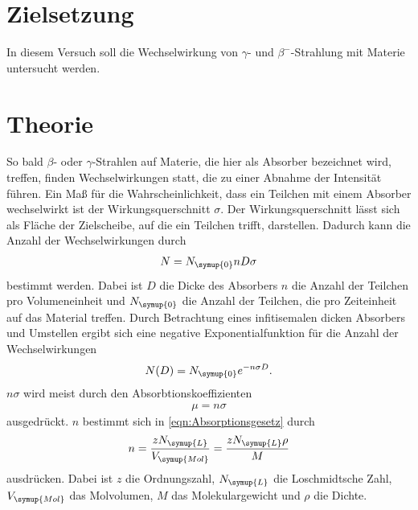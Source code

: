 \section{Zielsetzung}
\label{sec:Zielsetzung}
In diesem Versuch soll die Wechselwirkung von $\gamma$- und $\beta^{-}$-Strahlung mit Materie untersucht werden.

\section{Theorie}
\label{sec:Theorie}
So bald $\beta$- oder $\gamma$-Strahlen auf Materie, die hier als Absorber bezeichnet wird, treffen, finden
Wechselwirkungen statt, die zu einer Abnahme der Intensität führen. Ein Maß für die Wahrscheinlichkeit, dass
ein Teilchen mit einem Absorber wechselwirkt ist der Wirkungsquerschnitt $\sigma$. Der Wirkungsquerschnitt lässt
sich als Fläche der Zielscheibe, auf die ein Teilchen trifft, darstellen. Dadurch kann die Anzahl der
Wechselwirkungen durch
\begin{align*}
    N = N_{\symup{0}} n D \sigma
\end{align*}
bestimmt werden. Dabei ist $D$ die Dicke des Absorbers $n$ die Anzahl der Teilchen pro Volumeneinheit und
$N_{\symup{0}}$ die Anzahl der Teilchen, die pro Zeiteinheit auf das Material treffen. Durch Betrachtung eines
infitisemalen dicken Absorbers und Umstellen ergibt sich eine negative Exponentialfunktion für die Anzahl der
Wechselwirkungen
\begin{align}
    \label{eqn:Absorptionsgesetz}
    N(D) = N_{\symup{0}} e^{-n \sigma D}.
\end{align}
$n \sigma$ wird meist durch den Absorbtionskoeffizienten
\begin{align}
    \label{eqn:Absorbtionskoeffizient}
    \mu = n\sigma
\end{align}
ausgedrückt. $n$ bestimmt sich in \autoref{eqn:Absorptionsgesetz} durch
\begin{align*}
    n = \frac{zN_{\symup{L}}}{V_{\symup{Mol}}} = \frac{zN_{\symup{L}}\rho}{M}
\end{align*}
ausdrücken. Dabei ist $z$ die Ordnungszahl, $N_{\symup{L}}$ die Loschmidtsche Zahl, $V_{\symup{Mol}}$ das
Molvolumen, $M$ das Molekulargewicht und $\rho$ die Dichte.


